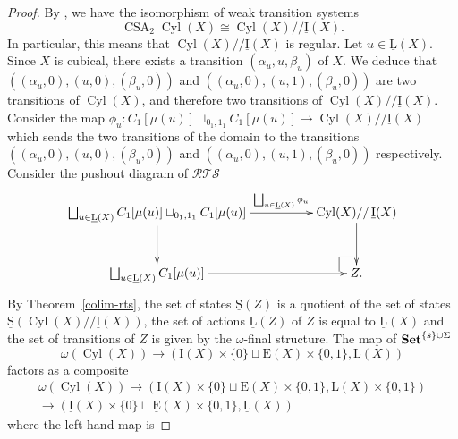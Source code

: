 \documentclass[a4paper,12pt]{amsart}
\begin{document}
\begin{proof} By \cite[Lemma~3.14]{biscsts1}, we have the isomorphism of weak
transition systems \[\operatorname{CSA}_2 \operatorname{{Cyl}}(X) {\cong} \operatorname{{Cyl}}(X)// \operatorname{\underline{I}}(X).\] In
particular, this means that $\operatorname{{Cyl}}(X)// \operatorname{\underline{I}}(X)$ is regular. Let $u\in
\operatorname{\underline{L}}(X)$. Since $X$ is cubical, there exists a transition
$(\alpha_u,u,\beta_u)$ of $X$. We deduce that
$((\alpha_u,0),(u,0),(\beta_u,0))$ and
$((\alpha_u,0),(u,1),(\beta_u,0))$ are two transitions of $\operatorname{{Cyl}}(X)$,
and therefore two transitions of $\operatorname{{Cyl}}(X)//\operatorname{\underline{I}}(X)$. Consider the map
$\phi_u:C_1[\mu(u)] \sqcup_{0_1,1_1} C_1[\mu(u)] \to \operatorname{{Cyl}}(X)//\operatorname{\underline{I}}(X)$
which sends the two transitions of the domain to the transitions
$((\alpha_u,0),(u,0),(\beta_u,0))$ and
$((\alpha_u,0),(u,1),(\beta_u,0))$ respectively.  Consider the pushout
diagram of ${\mathcal{R\!T\!S}}$
\[
\xymatrix@C=5em@R=3em
{
\bigsqcup_{u\in \operatorname{\underline{L}}(X)} C_1[\mu(u)] \sqcup_{0_1,1_1} C_1[\mu(u)] {\ar@{->}[d]_-{{}}} {\ar@{->}[r]^-{{\bigsqcup_{u\in \operatorname{\underline{L}}(X)} \phi_u}}} & \operatorname{{Cyl}}(X)//\operatorname{\underline{I}}(X) {\ar@{->}[d]_-{{}}} \\
\bigsqcup_{u\in \operatorname{\underline{L}}(X)} C_1[\mu(u)] {\ar@{->}[r]^-{{}}} & {  \ar@{-}[]+L+<-6pt,+2pt>;[]+LU+<-6pt,+6pt>  \ar@{-}[]+U+<-2pt,+6pt>;[]+LU+<-6pt,+6pt>} Z.
}
\]
By Theorem~\ref{colim-rts}, the set of states $\operatorname{\underline{S}}(Z)$ is a quotient
of the set of states $\operatorname{\underline{S}}(\operatorname{{Cyl}}(X)//\operatorname{\underline{I}}(X))$, the set of actions
$\operatorname{\underline{L}}(Z)$ of $Z$ is equal to $\operatorname{\underline{L}}(X)$ and the set of transitions of $Z$
is given by the $\omega$-final structure.  The map of ${{{\rm{\mathbf{{Set}}}}}}^{\{s\}\cup
  \Sigma}$ \[\omega(\operatorname{{Cyl}}(X))
\longrightarrow (\operatorname{\underline{I}}(X)\times \{0\} \sqcup \operatorname{\underline{E}}(X)\times \{0,1\},\operatorname{\underline{L}}(X))\]  factors as a composite
\begin{multline*}\omega(\operatorname{{Cyl}}(X))\longrightarrow (\operatorname{\underline{I}}(X)\times \{0\} \sqcup \operatorname{\underline{E}}(X)\times \{0,1\},\operatorname{\underline{L}}(X)\times \{0,1\})
  \\\longrightarrow (\operatorname{\underline{I}}(X)\times \{0\} \sqcup \operatorname{\underline{E}}(X)\times \{0,1\},\operatorname{\underline{L}}(X))\end{multline*} where the left hand map is

\end{proof}
\end{document}
